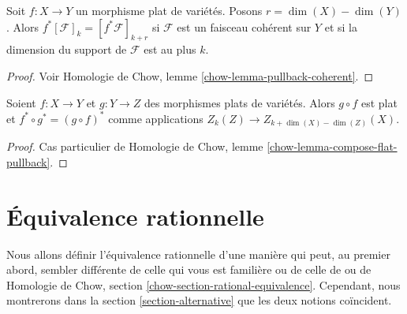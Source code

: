 \begin{lemma}
\label{lemma-pullback}
Soit $f : X \to Y$ un morphisme plat de variétés. Posons $r = \dim(X) - \dim(Y)$.
Alors $f^*[\mathcal{F}]_k = [f^*\mathcal{F}]_{k + r}$
si $\mathcal{F}$ est un faisceau cohérent sur $Y$ et si la dimension du
support de $\mathcal{F}$ est au plus $k$.
\end{lemma}

\begin{proof}
Voir Homologie de Chow, lemme \ref{chow-lemma-pullback-coherent}.
\end{proof}

\begin{lemma}
\label{lemma-compose-flat-pullback}
Soient $f : X \to Y$ et $g : Y \to Z$ des morphismes plats de
variétés. Alors $g \circ f$ est plat et $f^* \circ g^* = (g \circ f)^*$
comme applications $Z_k(Z) \to Z_{k + \dim(X) - \dim(Z)}(X)$.
\end{lemma}

\begin{proof}
Cas particulier de Homologie de Chow, lemme \ref{chow-lemma-compose-flat-pullback}.
\end{proof}


\section{Équivalence rationnelle}
\label{section-rational-equivalence}

\noindent
Nous allons définir l'équivalence rationnelle d'une manière qui peut, au premier
abord, sembler différente de celle qui vous est familière ou de celle
de \cite[chapitre I]{F} ou de
Homologie de Chow, section \ref{chow-section-rational-equivalence}.
Cependant, nous montrerons dans la section \ref{section-alternative} que
les deux notions coïncident.

